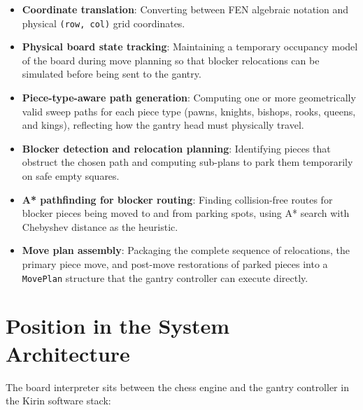 \documentclass[11pt,a4paper]{report}
\begin{document}
\begin{itemize}
    \item \textbf{Coordinate translation}: Converting between FEN algebraic notation and physical \texttt{(row, col)} grid coordinates.
    \item \textbf{Physical board state tracking}: Maintaining a temporary occupancy model of the board during move planning so that blocker relocations can be simulated before being sent to the gantry.
    \item \textbf{Piece-type-aware path generation}: Computing one or more geometrically valid sweep paths for each piece type (pawns, knights, bishops, rooks, queens, and kings), reflecting how the gantry head must physically travel.
    \item \textbf{Blocker detection and relocation planning}: Identifying pieces that obstruct the chosen path and computing sub-plans to park them temporarily on safe empty squares.
    \item \textbf{A* pathfinding for blocker routing}: Finding collision-free routes for blocker pieces being moved to and from parking spots, using A* search with Chebyshev distance as the heuristic.
    \item \textbf{Move plan assembly}: Packaging the complete sequence of relocations, the primary piece move, and post-move restorations of parked pieces into a \texttt{MovePlan} structure that the gantry controller can execute directly.
\end{itemize}

\section{Position in the System Architecture}

The board interpreter sits between the chess engine and the gantry controller in the Kirin software stack:

\begin{center}
\end{center}
\end{document}
